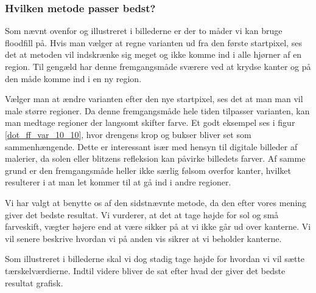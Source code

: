 {\subsubsection{Hvilken metode passer bedst?}
Som nævnt ovenfor og illustreret i billederne er der to måder vi kan
bruge floodfill på. Hvis man vælger at regne varianten ud fra den første
startpixel, ses det at metoden vil indskrænke sig meget og ikke komme
ind i alle hjørner af en region. Til gengæld har denne fremgangsmåde
sværere ved at krydse kanter og på den måde komme ind i en ny region.

Vælger man at ændre varianten efter den nye startpixel, ses det at man
man vil male større regioner. Da denne fremgangsmåde hele tiden
tilpasser varianten, kan man medtage regioner der langsomt skifter
farve. Et godt eksempel ses i figur \ref{dot_ff_var_10_10}, hvor
drengens krop og bukser bliver set som sammenhængende. Dette er
interessant især med hensyn til digitale billeder af malerier, da solen
eller blitzens refleksion kan påvirke billedets farver. Af samme grund
er den fremgangsmåde heller ikke særlig følsom overfor kanter, hvilket
resulterer i at man let kommer til at gå ind i andre regioner.

Vi har valgt at benytte os af den sidstnævnte metode, da den efter vores
mening giver det bedste resultat. Vi vurderer, at det at tage højde for sol og
små farveskift, vægter højere end at være sikker på at vi ikke går ud
over kanterne. Vi vil senere beskrive hvordan vi på anden vis sikrer at
vi beholder kanterne.

Som illustreret i billederne skal vi dog stadig tage højde for hvordan
vi vil sætte tærskelværdierne. Indtil videre bliver de sat efter hvad
der giver det bedste resultat grafisk.


}


